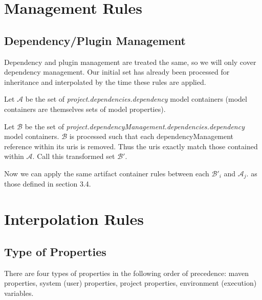 \documentclass[12pt]{amsart}
\begin{document}
\section{Management Rules}
\subsection{Dependency/Plugin Management}
Dependency and plugin management are treated the same, so we will only cover dependency management. Our initial set has already been processed for inheritance and interpolated by the time these rules are applied. 

Let \begin{math}\mathcal{A}\end{math} be the set of \emph{project.dependencies.dependency} model containers (model containers are themselves sets of model properties). 

Let \begin{math}\mathcal{B}\end{math} be the set of 
\emph{project.dependencyManagement.dependencies.dependency }model containers. \begin{math}\mathcal{B}\end{math} is processed such that each dependencyManagement reference within its uris is removed. Thus the uris exactly match those contained within \begin{math}\mathcal{A}\end{math}. Call this transformed set \begin{math} \mathcal{B'}\end{math}. 

Now we can apply the same artifact container rules between each  \begin{math} \mathcal{B'}_{i} \end{math} and  \begin{math} \mathcal{A}_{j}\end{math}.  as those defined in section 3.4.

\section{Interpolation Rules}
\subsection{Type of Properties}
There are four types of properties in the following order of precedence: maven properties, system (user) properties, project properties, environment (execution) variables. 
\end{document}
